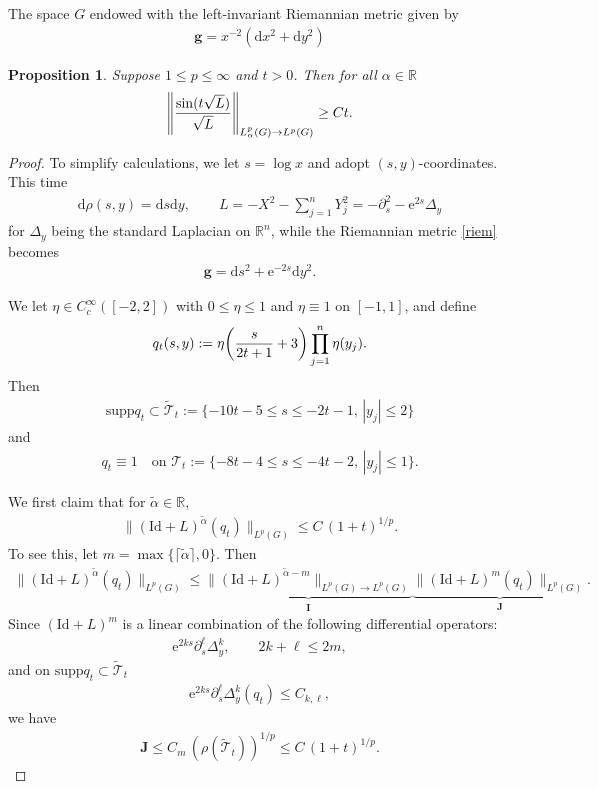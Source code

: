 \documentclass[10pt,a4paper]{amsart}
\newtheorem{proposition}{Proposition}
\newcommand{\R}{\mathbb{R}}
\newcommand{\e}{\mathrm{e}}
\newcommand{\Id}{\mathrm{Id}}
\newcommand{\supp}{\mathrm{supp}}
\newcommand{\g}{\mathbf{g}}
\renewcommand{\d}{\mathrm{d}}
\begin{document}
The space $G$ endowed with the left-invariant Riemannian metric given by
\begin{align}\label{riem}
\g=x^{-2}(\d x^2+\d y^2)
\end{align}

\begin{proposition}\label{prop5.1}
Suppose $1\leq p\leq\infty$ and $t>0$. Then for all $\alpha\in\R$
\begin{align*}
\left\|{\sin(t\sqrt{L})\over\sqrt{L}}\right\|_{L^p_\alpha(G)\to L^p(G)}\geq Ct.
\end{align*}
\end{proposition}

\begin{proof}
To simplify calculations, we let $s=\log x$ and adopt $(s,y)$-coordinates. This time
\begin{align*}
\d\rho(s,y)=\d s\d y,\qquad L=-X^2-\sum_{j=1}^nY_j^2=-\partial_s^2-\e^{2s}\Delta_y
\end{align*}
for $\Delta_y$ being the standard Laplacian on $\R^n$, while the Riemannian metric \eqref{riem} becomes
\begin{align}\label{riem-sy}
\g=\d s^2+\e^{-2s}\d y^2.
\end{align}

We let $\eta\in C^\infty_c([-2,2])$ with $0\leq \eta\leq 1$ and $\eta\equiv 1$ on $[-1,1]$, and define
\begin{align*}
q_t(s,y):=\eta\!\left({s\over 2t+1}+3\right)\prod_{j=1}^n\eta(y_j).
\end{align*}
Then
\begin{align*}
\supp q_t\subset \widetilde{\mathcal{T}}_t:=\{-10t-5\leq s\leq -2t-1,\, |y_j|\leq 2\}
\end{align*}
and
\begin{align*}
q_t\equiv 1\quad\text{on }\mathcal{T}_t:=\{-8t-4\leq s\leq -4t-2,\, |y_j|\leq 1\}.
\end{align*}
\smallskip

We first claim that for $\widetilde{\alpha}\in\R$,
\begin{align}\label{eq:prop5.1claim}
\|(\Id+L)^{\widetilde{\alpha}}(q_t)\|_{L^p(G)}\leq C\, (1+t)^{1/p}.
\end{align}
To see this, let $m=\max\{\lceil\widetilde{\alpha}\rceil,0\}$. Then
\begin{align}\label{eq:6.2}
\|(\Id+L)^{\widetilde{\alpha}}(q_t)\|_{L^p(G)}\leq \underbrace{\|(\Id+L)^{\widetilde{\alpha}-m}\|_{L^p(G)\to L^p(G)}}_{\mathbf I}\underbrace{\|(\Id+L)^m(q_t)\|_{L^p(G)}}_{\mathbf J}.
\end{align}
Since $(\Id+L)^m$ is a linear combination of the following differential operators:
\begin{align*}
\e^{2ks}\partial_s^\ell\Delta_y^k,\qquad 2k+\ell\leq 2m,
\end{align*}
and on $\supp q_t\subset \widetilde{\mathcal{T}}_t$
\begin{align*}
\e^{2ks}\partial_s^\ell\Delta_y^k(q_t)\leq C_{k,\ell},
\end{align*}
we have
\begin{align*}
\mathbf J\leq C_m\,(\rho(\widetilde{\mathcal{T}}_t))^{1/p}\leq C\, (1+t)^{1/p}.
\end{align*}


\end{proof}
\end{document}
